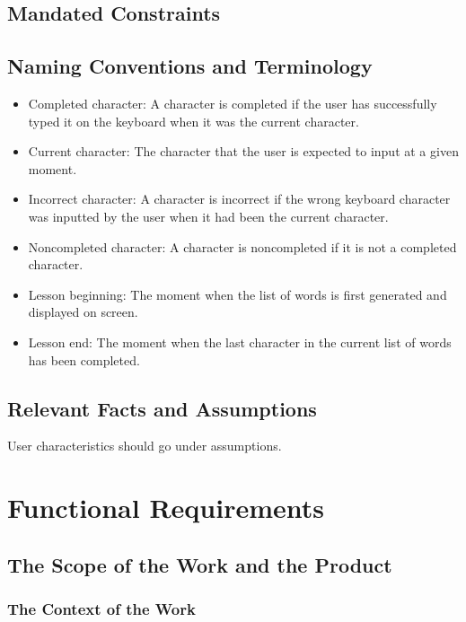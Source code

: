 \documentclass[12pt, titlepage]{article}
\begin{document}
\subsection{Mandated Constraints}

\subsection{Naming Conventions and Terminology}

\begin{itemize}
    \item Completed character: A character is completed if the user has successfully typed it on the keyboard when it was the current character. 
    \item Current character: The character that the user is expected to input at a given moment.
    \item Incorrect character: A character is incorrect if the wrong keyboard character was inputted by the user when it had been the current character.
    \item Noncompleted character: A character is noncompleted if it is not a completed character.
    \item Lesson beginning: The moment when the list of words is first generated and displayed on screen.
    \item Lesson end: The moment when the last character in the current list of words has been completed.
\end{itemize}



\subsection{Relevant Facts and Assumptions}

User characteristics should go under assumptions.

\section{Functional Requirements}

\subsection{The Scope of the Work and the Product}

\subsubsection{The Context of the Work}
\end{document}
